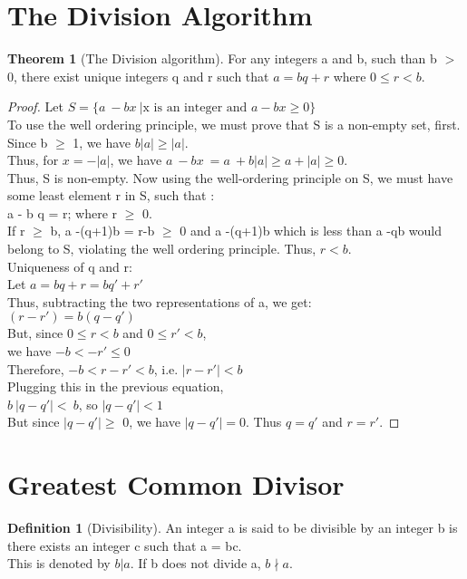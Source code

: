 \documentclass[15,a4paper]{report}
\theoremstyle{definition}
\newtheorem{definition}{Definition}[section]
\newtheorem{theorem}{Theorem}[section]
\theoremstyle{remark}
\begin{document}
\section{The Division Algorithm} 
\begin{theorem}[The Division algorithm]
    For any integers a and b, such than b $>$ 0, there exist unique integers q and r such that $ a = bq + r$ where $0 \leq r < b$.
\end{theorem}
\begin{proof}
    Let $S = \{a~-bx~| \textrm{x is an integer and }a-bx\geq 0\}$\\
    To use the well ordering principle, we must prove that S is a non-empty set, first.\\
    Since b $\geq$ 1, we have $b|a| \geq |a|$.\\
    Thus, for $x = -|a|$, we have $ a~-bx~= a~+b|a| \geq a+|a| \geq 0$.\\
    Thus, S is non-empty. Now using the well-ordering principle on S, we must have some least element r in S, such that :\\
    a - b q = r; where r $\geq$ 0.\\
    If r $\geq$ b, a -(q+1)b = r-b $\geq$ 0 and a -(q+1)b which is less than a -qb would belong to S, violating the well ordering principle. Thus, $r<b$.\\
    Uniqueness of q and r:\\
    Let $a = bq +r = bq' + r'$\\
    Thus, subtracting the two representations of a, we get:\\
    $(r - r')= b(q - q')$\\
    But, since $0 \leq r <b$ and $0\leq r' <b$,\\
    we have $-b < -r' \leq 0$\\
    Therefore, $ -b < r - r' < b$, i.e. $|r-r'|<b$\\
    Plugging this in the previous equation, \\
    $b~|q-q'|<~b$, so $|q-q'| <1$\\
    But since $ |q-q'| \geq$ 0, we have $|q-q'|=0$. Thus $ q=q'$ and $ r=r'$. 
\end{proof}


\section{Greatest Common Divisor}
\begin{definition}[Divisibility]
    An integer a is said to be divisible by an integer b is there exists an integer c such that a = bc.\\
    This is denoted by $b|a$. If b does not divide a, $b\nmid a$.
\end{definition}
\end{document}
